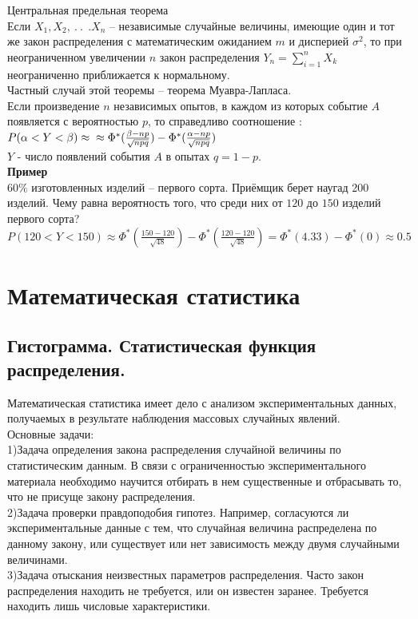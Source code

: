 \documentclass[russian, 12pt, fleqn]{article}
\begin{document}
$\textbf{Центральная предельная теорема}$\\
Если $X_1,$$ X_2,\ .\ .\ \ . X_n$ -- независимые случайные  величины, имеющие один и тот же закон распределения с математическим ожиданием $m$ и дисперией $\sigma^2$,
то при неограниченном увеличении $n$ закон распределения $Y_n = \displaystyle{\sum\limits_{i = 1}^{n}} X_k$ неограниченно приближается к нормальному.\\
Частный случай этой теоремы -- теорема Муавра-Лапласа.\\
Если произведение $n$ независимых опытов, в каждом из которых событие $A$ появляется с вероятностью $p$, то справедливо соотношение : $P(\alpha < Y < \beta) \approx\\ 
 \approx \Phi^*(\frac{\beta - np}{\sqrt{npq}}) - \Phi^*(\frac{\alpha - np}{\sqrt{npq}})$\\
$Y$ - число появлений события $A$  в опытах $q = 1 - p$.\\
\textbf{Пример} \\
$60 \%$ изготовленных изделий -- первого сорта. Приёмщик берет наугад 200 изделий. Чему равна вероятность того, что среди них от $120$ до $150$ изделий первого сорта?\\
$P(120 < Y < 150) \approx \Phi^*(\frac{150-120}{\sqrt{48}}) - \Phi^*(\frac{120 - 120}{\sqrt{48}}) = \Phi^*(4.33) - \Phi^*(0)  \approx 0.5$ \\
\section{Математическая статистика}
\subsection{Гистограмма. Статистическая функция распределения.}
Математическая статистика имеет дело с анализом экспериментальных данных, получаемых в результате наблюдения массовых случайных явлений.\\
Основные задачи:\\
1)Задача определения закона распределения случайной величины по статистическим данным. В связи с ограниченностью 
экспериментального материала необходимо научится отбирать в нем существенные и отбрасывать то, что не присуще закону распределения.\\
2)Задача проверки правдоподобия гипотез. Например, согласуются ли 
экспериментальные данные с тем, что случайная величина распределена по данному закону, или существует или нет зависимость между двумя случайными величинами.\\
3)Задача отыскания неизвестных параметров распределения. Часто закон распределения находить не требуется, или он известен заранее. Требуется находить лишь числовые характеристики.\\
\end{document}
